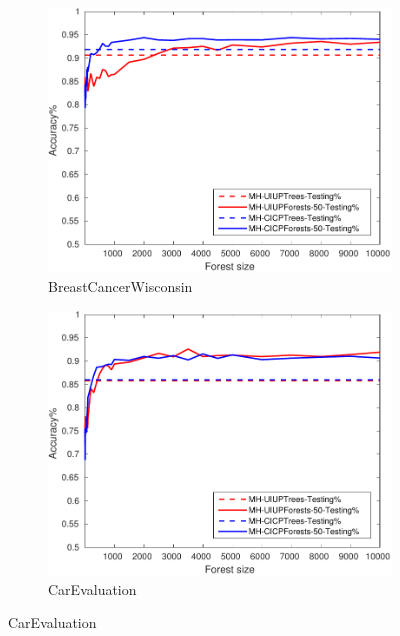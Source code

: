 \begin{figure}[ht]
	\centering

  \begin{subfigure}[b]{0.3\textwidth}
		\centering
		\includegraphics[width=\textwidth]{figs/PLPTF/Forests/BreastCancerWisconsinDownsampled_Forests_MH.pdf}
		\caption{BreastCancerWisconsin}
		\label{fig:B4}
	\end{subfigure}
  \begin{subfigure}[b]{0.3\textwidth}
		\centering
  	\includegraphics[width=\textwidth]{figs/PLPTF/Forests/CarEvaluation_Forests_MH.pdf}
  	\caption{CarEvaluation}
		\label{fig:Car4}
	\end{subfigure}

\end{figure}
